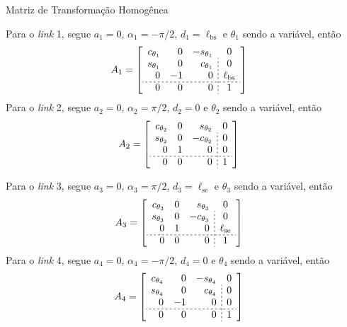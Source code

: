 \documentclass[aspectratio=169]{beamer}
\begin{document}
\begin{frame}{Matriz de Transformação Homogênea}
\begin{minipage}{0.48\textwidth}
Para o \textit{link} 1, segue $a_1 = 0$, $\alpha_1 = -\pi/2$, $d_1=\ell_\mathrm{bs}$ e $\theta_1$ sendo a variável, então
\begin{align*}
    A_1 
    &=
    \left[ 
    \begin{array}{rrr;{2pt/2pt}c}
        c_{\theta_1} & 0 & -s_{\theta_1} & 0 \\
        s_{\theta_1} & 0 &  c_{\theta_1} & 0 \\
        0 & -1 & 0 & \ell_\mathrm{bs} \\
        \hdashline[2pt/2pt]
        0 & 0 & 0 & 1
    \end{array}
    \right]
\end{align*}
Para o \textit{link} 2, segue $a_2 = 0$, $\alpha_2 = \pi/2$, $d_2=0$ e $\theta_2$ sendo a variável, então
\begin{align*}
    A_2 &=
    \left[ 
    \begin{array}{rrr;{2pt/2pt}c}
        c_{\theta_2} & 0 &  s_{\theta_2} & 0 \\
        s_{\theta_2} & 0 & -c_{\theta_2} & 0 \\
        0 & 1 & 0 &  0 \\
        \hdashline[2pt/2pt]
        0 & 0 & 0 & 1
    \end{array}
    \right]
\end{align*}
\end{minipage}
\hfill
\begin{minipage}{0.48\textwidth}
Para o \textit{link} 3, segue $a_3 = 0$, $\alpha_3 = \pi/2$, $d_3=\ell_\mathrm{se}$ e $\theta_3$ sendo a variável, então
\begin{align*}
    A_3 &=
    \left[ 
    \begin{array}{rrr;{2pt/2pt}c}
        c_{\theta_3} & 0 &  s_{\theta_3} & 0 \\
        s_{\theta_3} & 0 & -c_{\theta_3} & 0 \\
        0 & 1 & 0 &  \ell_\mathrm{se} \\
        \hdashline[2pt/2pt]
        0 & 0 & 0 & 1
    \end{array}
    \right]
\end{align*}
Para o \textit{link} 4, segue $a_4 = 0$, $\alpha_4 = -\pi/2$, $d_4=0$ e $\theta_4$ sendo a variável, então
\begin{align*}
    A_4 
    &=
    \left[ 
    \begin{array}{rrr;{2pt/2pt}c}
        c_{\theta_4} & 0 & -s_{\theta_4} & 0 \\
        s_{\theta_4} & 0 &  c_{\theta_4} & 0 \\
        0 & -1 & 0 & 0 \\
        \hdashline[2pt/2pt]
        0 & 0 & 0 & 1
    \end{array}
    \right]
\end{align*}
\end{minipage}
\end{frame}
\end{document}
